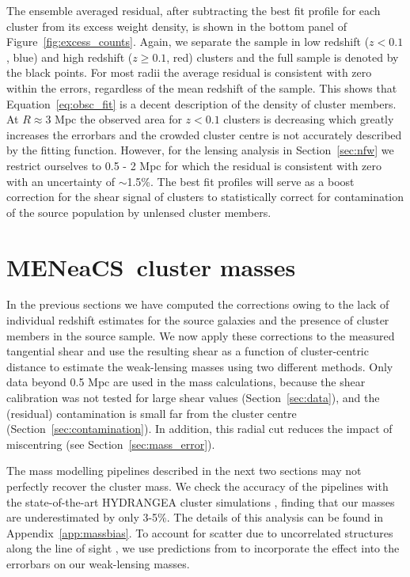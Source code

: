 \documentclass[useAMS,usenatbib]{mnras}
\newcommand{\mn}{MENeaCS}
\begin{document}
The ensemble averaged residual, after subtracting the best fit profile for each cluster from its excess weight density, is shown in the bottom panel of Figure~\ref{fig:excess_counts}. Again, we separate the sample in low redshift ($z<0.1$, blue) and high redshift ($z\geq0.1$, red) clusters and the full sample is denoted by the black points. 
For most radii the average residual is consistent with zero within the errors, regardless of the mean redshift of the sample. This shows that Equation~\ref{eq:obsc_fit} is a decent description of the density of cluster members. At $R \approx 3$ Mpc the observed area for $z<0.1$ clusters is decreasing which greatly increases the errorbars and the crowded cluster centre is not accurately described by the fitting function. However, for the lensing analysis in Section~\ref{sec:nfw} we restrict ourselves to 0.5 - 2 Mpc for which the residual is consistent with zero with an uncertainty of $\sim$1.5\%. The best fit profiles will serve as a boost correction for the shear signal of clusters to statistically correct for contamination of the source population by unlensed cluster members.	




\section{\mn \ cluster masses}
\label{sec:masses}

In the previous sections we have computed the corrections owing to the lack of individual redshift estimates for the source galaxies and the presence of cluster members in the source sample. We now apply these corrections to the measured tangential shear and use the resulting shear as a function of cluster-centric distance to estimate the weak-lensing masses using two different methods. Only data beyond 0.5 Mpc are used in the mass calculations, because the shear calibration was not tested for large shear values (Section~\ref{sec:data}), and the (residual) contamination is small far from the cluster centre (Section~\ref{sec:contamination}). In addition, this radial cut reduces the impact of miscentring (see Section~\ref{sec:mass_error}).

The mass modelling pipelines described in the next two sections may not perfectly recover the cluster mass. We check the accuracy of the pipelines with the state-of-the-art HYDRANGEA cluster simulations \citep{bahe17, barnes17}, finding that our masses are underestimated by only 3-5\%. The details of this analysis can be found in Appendix~\ref{app:massbias}. To account for scatter due to uncorrelated structures along the line of sight \citep{hoekstra01}, we use predictions from \citet{hoekstra11} to incorporate the effect into the errorbars on our weak-lensing masses.
\end{document}
